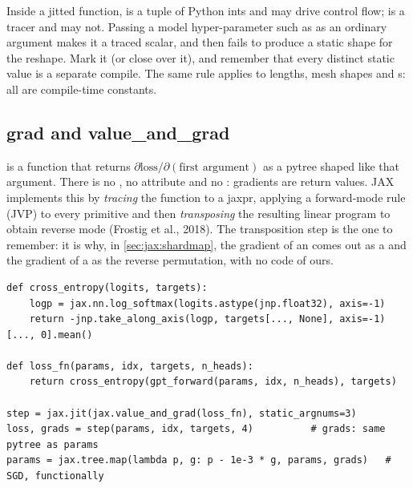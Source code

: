 \begin{pitfall}
Inside a jitted function,  is a tuple of Python ints and may drive control
flow;  is a tracer and may not. Passing a model hyper-parameter such as
 as an ordinary argument makes it a traced  scalar, and
 then fails to produce a static shape for the reshape. Mark it
 (or close over it), and remember that every distinct static value is
a separate compile. The same rule applies to  lengths, mesh shapes and
s: all are compile-time constants.
\end{pitfall}

\subsection{grad and value\_and\_grad}
 is a function that returns $\partial\text{loss}/\partial(\text{first
argument})$ as a pytree shaped like that argument. There is no , no
 attribute and no : gradients are return values. JAX
implements this by \emph{tracing} the function to a jaxpr, applying a forward-mode rule
(JVP) to every primitive and then \emph{transposing} the resulting linear program to obtain
reverse mode (Frostig et al., 2018). The transposition step is the one to remember: it is why,
in \cref{sec:jax:shardmap}, the gradient of an  comes out as a
 and the gradient of a  as the reverse permutation, with no
code of ours.

\begin{lstlisting}[caption={Loss and gradient for the JAX GPT. \code{value\_and\_grad} returns both in one traced program.},label={lst:jax:grad}]
def cross_entropy(logits, targets):
    logp = jax.nn.log_softmax(logits.astype(jnp.float32), axis=-1)
    return -jnp.take_along_axis(logp, targets[..., None], axis=-1)[..., 0].mean()

def loss_fn(params, idx, targets, n_heads):
    return cross_entropy(gpt_forward(params, idx, n_heads), targets)

step = jax.jit(jax.value_and_grad(loss_fn), static_argnums=3)
loss, grads = step(params, idx, targets, 4)          # grads: same pytree as params
params = jax.tree.map(lambda p, g: p - 1e-3 * g, params, grads)   # SGD, functionally
\end{lstlisting}

